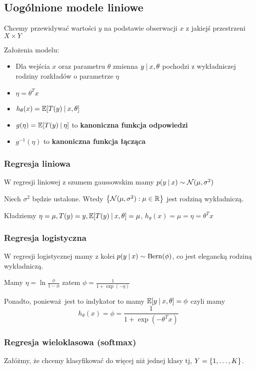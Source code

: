 \subsection{Uogólnione modele liniowe}

Chcemy przewidywać wartości \( y \) na podstawie obserwacji \( x \) z jakiejś przestrzeni \( X \times Y \)

Założenia modelu:
\begin{itemize}
	\item Dla wejścia \( x \) oraz parametru \( \theta \) zmienna \( y \:\vert\: x, \theta \) pochodzi z wykładniczej rodziny rozkładów o parametrze \( \eta \)
	\item \( \eta = \theta^T x \)
	\item \( h_\theta(x) = \expected{T(y) \given x, \theta} \)
	\item \( g(\eta) = \expected{T(y) \given \eta} \) to \textbf{kanoniczna funkcja odpowiedzi}
	\item \( g^{-1}(\eta) \) to \textbf{kanoniczna funkcja łącząca}
\end{itemize}

\subsubsection{Regresja liniowa}

W regresji liniowej z szumem gaussowskim mamy \( p(y \:\vert\: x) \sim \operatorname{\mathcal{N}}(\mu, \sigma^2) \)

Niech \( \sigma^2 \) będzie ustalone.
Wtedy \( \set{\Normal(\mu, \sigma^2) : \mu \in \real } \) jest rodziną wykładniczą.

Kładziemy \( \eta = \mu, T(y) = y, \expected{T(y) \given x, \theta} = \mu \), \( h_\theta(x) = \mu = \eta = \theta^T x \)

\subsubsection{Regresja logistyczna}

W regresji logistycznej mamy z kolei \( p(y \:\vert\: x) \sim \operatorname{Bern}(\phi) \), co jest elegancką rodziną wykładniczą.

Mamy \( \eta = \ln \frac{\phi}{1 - \phi} \) zatem \( \phi = \frac{1}{1 + \exp(-\eta)} \)

Ponadto, ponieważ jest to indykator to mamy \( \expected{y \given x, \theta} = \phi \)
czyli mamy
\[
	h_\theta(x) = \phi = \frac{1}{1 + \exp(-\theta^T x)}
\]


\subsubsection{Regresja wieloklasowa (softmax)}
Załóżmy, że chcemy klasyfikować do więcej niż jednej klasy tj, \( Y = \set{1, \dots, K} \).

